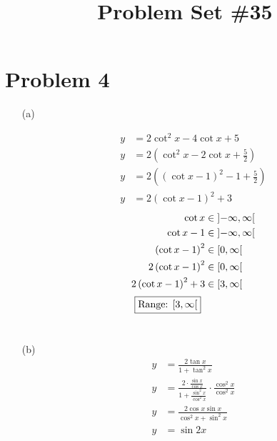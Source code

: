\documentclass{article}
\begin{document}
\pagebreak
\title{Problem Set \#35}
\maketitle

\section*{Problem 4}
\begin{itemize}
\item[(a)]
	\begin{multicols}{2}
	\begin{align*}
		y&=2\cot^2x-4\cot x+5 \\
		y&=2\left(\cot^2x-2\cot x+\frac{5}{2}\right) \\
		y&=2\left(\left(\cot x-1\right)^2-1+\frac{5}{2}\right) \\
		y&=2\left(\cot x-1\right)^2+3
	\end{align*}
	\vfill\null\columnbreak
	\begin{align*}
		\cot x&\in\interval[scaled,open left,open right]
			{-\infty}{\infty} \\
		\cot x-1&\in\interval[scaled,open left,open right]
			{-\infty}{\infty} \\
		\left(\cot x-1\right)^2&\in\interval[scaled,open right]
			{0}{\infty} \\
		2\left(\cot x-1\right)^2&\in\interval[scaled,open right]
			{0}{\infty} \\
		2\left(\cot x-1\right)^2+3&\in\interval
			[scaled,open right]{3}{\infty} \\
		\intertext{\centering{
			\boxed{\text{Range: }\interval[scaled,open right]{3}{\infty}}}} \\
	\end{align*}
	\end{multicols}

\item[(b)]
	\begin{align*}
		y&=\frac{2\tan x}{1+\tan^2x} \\
		y&=\frac{2\cdot\frac{\sin x}{\cos x}}
		{1+\frac{\sin^2x}{\cos^2x}}\cdot\frac{\cos^2x}{\cos^2x} \\
		y&=\frac{2\cos x\sin x}{\cos^2x+\sin^2x} \\
		y&=\sin2x
	\end{align*}
	\begin{center}
	\end{center}


\end{itemize}
\end{document}

